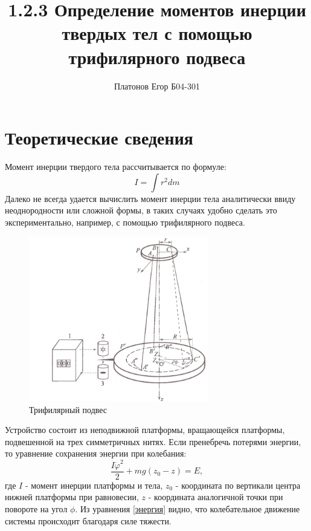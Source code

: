 \documentclass[a4paper, 12pt]{article}
\author{Платонов Егор Б04-301}
\title{1.2.3 Определение моментов инерции твердых тел с помощью трифилярного подвеса}
\date{}
\begin{document}
\maketitle
\section*{Теоретические сведения}
Момент инерции твердого тела рассчитывается по формуле:
\begin{equation}
I = \int r^2dm
\end{equation}
Далеко не всегда удается вычислить момент инерции тела аналитически ввиду неоднородности или сложной формы, в таких случаях удобно сделать это экспериментально, например, с помощью трифилярного подвеса.
\begin{figure}[h!]
\begin{center}
\includegraphics[width=0.7\textwidth]{Подвес}
\end{center}
\caption{Трифилярный подвес} \label{подвес}
\end{figure}
Устройство состоит из неподвижной платформы, вращающейся платформы, подвешенной на трех симметричных нитях.
Если пренебречь потерями энергии, то уравнение сохранения энергии при колебания:
\begin{equation}
\label{энергия}
\frac{I\dot{\varphi}^2}{2}+mg(z_0-z)=E,
\end{equation}
где $I$ - момент инерции платформы и тела, $z_0$ - координата по вертикали центра нижней платформы при равновесии, $z$ - координата аналогичной точки при повороте на угол $\phi$.
Из уравнения \ref{энергия} видно, что колебательное движение системы происходит благодаря силе тяжести. 
\end{document}
